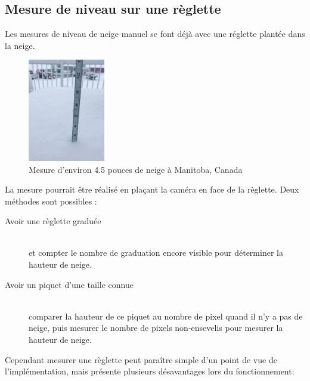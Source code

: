 \newpage

\subsection{Mesure de niveau sur une règlette}
Les mesures de niveau de neige manuel se font déjà avec une réglette plantée dans la neige.

\begin{figure}[H]
    \centering
    \includegraphics[width=0.3\textwidth]{Images/computer_vision/snow_meter.PNG}
    \caption[]{Mesure d'environ 4.5 pouces de neige à Manitoba, Canada\footnotemark[1]}
    \label{Snow meter}
\end{figure}
\noindent
La mesure pourrait être réalisé en plaçant la caméra en face de la règlette.
Deux méthodes sont possibles :
\begin{description}
    \item[Avoir une règlette graduée] \hfill \\
    et compter le nombre de graduation encore visible pour déterminer la hauteur de neige.
    \item[Avoir un piquet d'une taille connue] \hfill \\
    comparer la hauteur de ce piquet au nombre de pixel quand il n'y a pas de neige,
    puis mesurer le nombre de pixels non-ensevelis pour mesurer la hauteur de neige.
\end{description}
\noindent
Cependant mesurer une règlette peut paraître simple d'un point de vue de l'implémentation,
mais présente plusieurs désavantages lors du fonctionnement:


